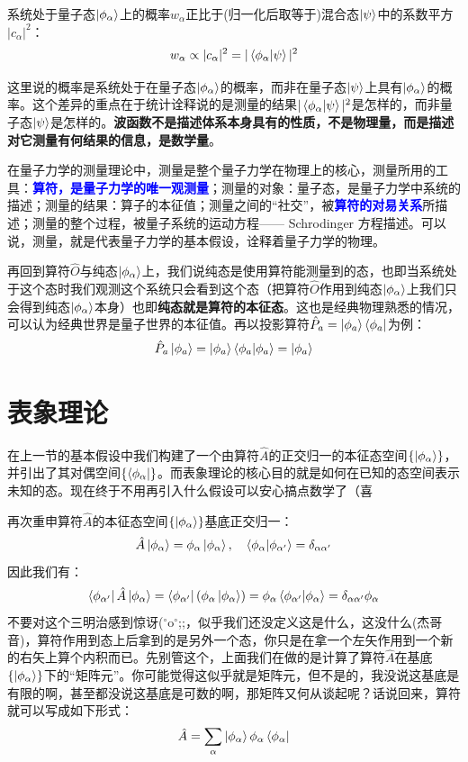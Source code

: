 \begin{theorem}[统计诠释]
系统处于量子态$\ket{\phi_{\alpha}}$上的概率$w_{\alpha}$正比于(归一化后取等于)混合态$\ket{\psi}$中的系数平方$|c_{\alpha}|^2$：
\[w_{\alpha}\propto|c_{\alpha}|^2=|\bra{\phi_{\alpha}}\ket{\psi}|^2\]
\end{theorem}

这里说的概率是系统处于在量子态$\ket{\phi_{\alpha}}$的概率，而非在量子态$\ket{\psi}$上具有$\ket{\phi_{\alpha}}$的概率。这个差异的重点在于统计诠释说的是测量的结果$|\bra{\phi_{\alpha}}\ket{\psi}|^2$是怎样的，而非量子态$\ket{\psi}$是怎样的。\textbf{波函数不是描述体系本身具有的性质，不是物理量，而是描述对它测量有何结果的信息，是数学量}。

在量子力学的测量理论中，测量是整个量子力学在物理上的核心，测量所用的工具：\textcolor{blue}{\textbf{算符，是量子力学的唯一观测量}}；测量的对象：量子态，是量子力学中系统的描述；测量的结果：算子的本征值；测量之间的“社交”，被\textcolor{blue}{\textbf{算符的对易关系}}所描述；测量的整个过程，被量子系统的运动方程—— Schrodinger 方程描述。可以说，测量，就是代表量子力学的基本假设，诠释着量子力学的物理。

再回到算符$\hat{O}$与纯态$\ket{\phi_{\alpha}}$上，我们说纯态是使用算符能测量到的态，也即当系统处于这个态时我们观测这个系统只会看到这个态（把算符$\hat{O}$作用到纯态$\ket{\phi_{\alpha}}$上我们只会得到纯态$\ket{\phi_{\alpha}}$本身）也即\textbf{纯态就是算符的本征态}。这也是经典物理熟悉的情况，可以认为经典世界是量子世界的本征值。再以投影算符$\hat{P}_a=\ket{\phi_a}\bra{\phi_a}$为例：
\[\hat{P}_a\ket{\phi_a}=\ket{\phi_a}\bra{\phi_a}\ket{\phi_a}=\ket{\phi_a}\]

\section{表象理论}
在上一节的基本假设中我们构建了一个由算符$\hat{A}$的正交归一的本征态空间$\{\ket{\phi_{\alpha}}\}$，并引出了其对偶空间$\{\bra{\phi_{\alpha}}\}$。而表象理论的核心目的就是如何在已知的态空间表示未知的态。现在终于不用再引入什么假设可以安心搞点数学了（喜

再次重申算符$\hat{A}$的本征态空间$\{\ket{\phi_{\alpha}}\}$基底正交归一：
\[\hat{A}\ket{\phi_{\alpha}}=\phi_{\alpha}\ket{\phi_{\alpha}}, \quad \bra{\phi_{\alpha}}\ket{\phi_{\alpha'}}=\delta_{\alpha\alpha'}\]
因此我们有：
\[\bra{\phi_{\alpha'}}\hat{A}\ket{\phi_{\alpha}}=\bra{\phi_{\alpha'}}\left(\phi_{\alpha}\ket{\phi_{\alpha}}\right)=\phi_{\alpha}\bra{\phi_{\alpha'}}\ket{\phi_{\alpha}}=\delta_{\alpha\alpha'}\phi_{\alpha}\]
不要对这个三明治感到惊讶($^{\circ}$o$^{\circ}$;;，似乎我们还没定义这是什么，这没什么(杰哥音)，算符作用到态上后拿到的是另外一个态，你只是在拿一个左矢作用到一个新的右矢上算个内积而已。先别管这个，上面我们在做的是计算了算符$\hat{A}$在基底$\{\ket{\phi_{\alpha}}\}$下的“矩阵元”。你可能觉得这似乎就是矩阵元，但不是的，我没说这基底是有限的啊，甚至都没说这基底是可数的啊，那矩阵又何从谈起呢？话说回来，算符就可以写成如下形式：
\[\hat{A}=\sum_{\alpha}\ket{\phi_{\alpha}}\phi_{\alpha}\bra{\phi_{\alpha}}\]

